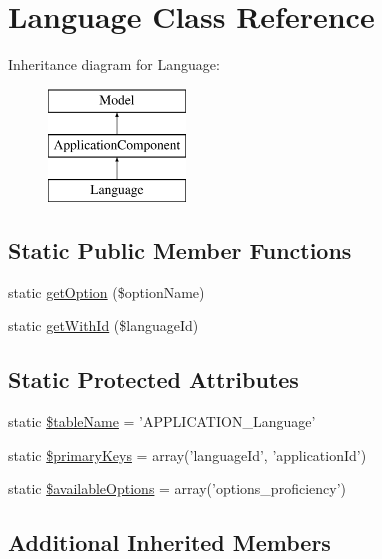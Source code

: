 \hypertarget{class_language}{\section{Language Class Reference}
\label{class_language}
}
Inheritance diagram for Language\-:\begin{figure}[H]
\begin{center}
\leavevmode
\includegraphics[height=3.000000cm]{class_language}
\end{center}
\end{figure}
\subsection*{Static Public Member Functions}
\begin{DoxyCompactItemize}
\item 
static \hyperlink{class_language_af80a87d235f78336a31ec6385c5682fb}{get\-Option} (\$option\-Name)
\item 
static \hyperlink{class_language_abd48a17580a61d087659ecfacb12ee1e}{get\-With\-Id} (\$language\-Id)
\end{DoxyCompactItemize}
\subsection*{Static Protected Attributes}
\begin{DoxyCompactItemize}
\item 
static \hyperlink{class_language_ab780211c5244ec4eb99b642d141b6ea9}{\$table\-Name} = 'A\-P\-P\-L\-I\-C\-A\-T\-I\-O\-N\-\_\-\-Language'
\item 
static \hyperlink{class_language_a768248776c14afa80f871a74895509e9}{\$primary\-Keys} = array('language\-Id', 'application\-Id')
\item 
static \hyperlink{class_language_ada247b75318a9221ed8454377cc507bc}{\$available\-Options} = array('options\-\_\-proficiency')
\end{DoxyCompactItemize}
\subsection*{Additional Inherited Members}


